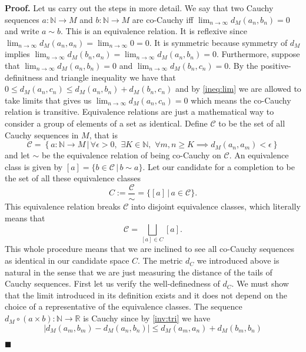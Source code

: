 \documentclass[10pt]{article}
\theoremstyle{definition}
\theoremstyle{remark}
\newenvironment{prf}{\noindent\textbf{Proof.}}{\hfill$\blacksquare$}
\begin{document}
\begin{prf}
Let us carry out the steps in more detail. We say that two Cauchy sequences $a:\mathbb{N}\to M$ and $b:\mathbb{N}\to M$ are co-Cauchy iff $\lim_{n\to\infty}d_M(a_n,b_n)=0$ and write $a\sim b$. This is an equivalence relation. It is reflexive since $\lim_{n\to\infty}d_M(a_n,a_n)=\lim_{n\to\infty}0=0$. It is symmetric because symmetry of $d_M$ implies $\lim_{n\to\infty}d_M(b_n,a_n)=\lim_{n\to\infty}d_M(a_n,b_n)=0$. Furthermore, suppose that $\lim_{n\to\infty}d_M(a_n,b_n)=0$ and $\lim_{n\to\infty}d_M(b_n,c_n)=0$. By the positive-definitness and triangle inequality we have that $0\leq d_M(a_n,c_n)\leq d_M(a_n,b_n)+d_M(b_n,c_n)$ and by \cref{ineq:lim} we are allowed to take limits that gives us $\lim_{n\to\infty}d_M(a_n,c_n)=0$ which means the co-Cauchy relation is transitive. Equivalence relations are just a mathematical way to consider a group of elements of a set as identical. Define $\mathscr{C}$ to be the set of all Cauchy sequences in $M$, that is
\begin{equation}
\mathscr{C}=\left\{a:\mathbb{N}\to M\,|\,\forall\epsilon>0,\,\,\exists K\in\mathbb{N},\,\,\forall m,n\ge K \implies d_M(a_n,a_m)<\epsilon\right\}
\end{equation}
and let $\sim$ be the equivalence relation of being co-Cauchy on $\mathscr{C}$. An equivalence class is given by $[a]=\{b\in\mathscr{C}\,|\,b\sim a\}$. Let our candidate for a completion to be the set of all these equivalence classes
\begin{equation}
C:=\frac{\mathscr{C}}{\sim}=\{[a]\,|\,a\in\mathscr{C}\}.
\end{equation}
This equivalence relation breaks $\mathscr{C}$ into disjoint equivalence classes, which literally means that
\begin{equation}
\mathscr{C}=\bigsqcup_{[a]\in C}[a].
\end{equation}
This whole procedure means that we are inclined to see all co-Cauchy sequences as identical in our candidate space $C$. The metric $d_C$ we introduced above is natural in the sense that we are just measuring the distance of the tails of Cauchy sequences. First let us verify the well-definedness of $d_C$. We must show that the limit introduced in its definition exists and it does not depend on the choice of a representative of the equivalence classes. The sequence $d_M\circ(a\times b):\mathbb{N}\to \mathbb{R}$ is Cauchy since by \cref{inv:tri} we have
\begin{equation}
|d_M(a_m,b_m)-d_M(a_n,b_n)|\leq d_M(a_m,a_n)+d_M(b_m,b_n)
\end{equation}

\end{prf}
\end{document}
